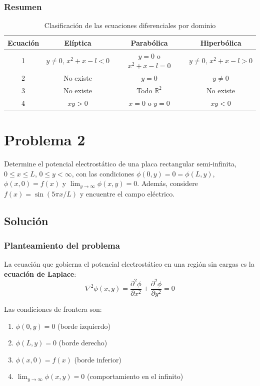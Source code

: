 \documentclass[a4paper]{article}
\begin{document}
\subsubsection{Resumen}

\begin{table}[h]
\centering
\begin{tabular}{|c|c|c|c|}
\hline
\textbf{Ecuación} & \textbf{Elíptica} & \textbf{Parabólica} & \textbf{Hiperbólica} \\
\hline
1 & $y \neq 0, \, x^2+x-l < 0$ & $y = 0$ o $x^2+x-l = 0$ & $y \neq 0, \, x^2+x-l > 0$ \\
\hline
2 & No existe & $y = 0$ & $y \neq 0$ \\
\hline
3 & No existe & Todo $\mathbb{R}^2$ & No existe \\
\hline
4 & $xy > 0$ & $x = 0$ o $y = 0$ & $xy < 0$ \\
\hline
\end{tabular}
\caption{Clasificación de las ecuaciones diferenciales por dominio}
\end{table}

\section{Problema 2}
Determine el potencial electrostático de una placa rectangular semi-infinita, $0 \leq x \leq L$, $0 \leq y < \infty$, con las condiciones $\phi(0, y) = 0 = \phi(L, y)$, $\phi(x, 0) = f(x)$ y $\lim_{y \to \infty} \phi(x, y) = 0$. Además, considere $f(x) = \sin(5\pi x/L)$ y encuentre el campo eléctrico.

\subsection{Solución}

\subsubsection{Planteamiento del problema}

La ecuación que gobierna el potencial electrostático en una región sin cargas es la \textbf{ecuación de Laplace}:
\begin{equation}
\nabla^2 \phi(x,y) = \frac{\partial^2 \phi}{\partial x^2} + \frac{\partial^2 \phi}{\partial y^2} = 0
\end{equation}

Las condiciones de frontera son:
\begin{enumerate}
    \item $\phi(0, y) = 0$ (borde izquierdo)
    \item $\phi(L, y) = 0$ (borde derecho)
    \item $\phi(x, 0) = f(x)$ (borde inferior)
    \item $\lim_{y \to \infty} \phi(x, y) = 0$ (comportamiento en el infinito)
\end{enumerate}
\end{document}
